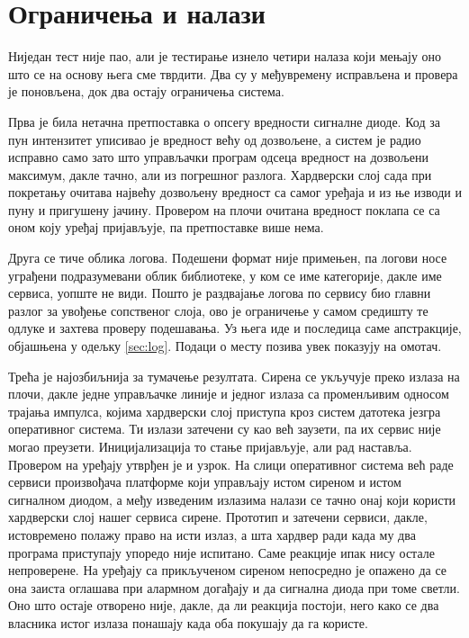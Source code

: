 \documentclass[12pt,oneside]{memoir}
\begin{document}
\section{Ограничења и налази}
\label{sec:ogranicenja}

Ниједан тест није пао, али је тестирање изнело четири налаза који мењају оно што се на
основу њега сме тврдити. Два су у међувремену исправљена и провера је поновљена, док два
остају ограничења система.

Прва је била нетачна претпоставка о опсегу вредности сигналне диоде. Код за пун интензитет
уписивао је вредност већу од дозвољене, а систем је радио исправно само зато што управљачки
програм одсеца вредност на дозвољени максимум, дакле тачно, али из погрешног разлога.
Хардверски слој сада при покретању очитава највећу дозвољену вредност са самог уређаја и из
ње изводи и пуну и пригушену јачину. Провером на плочи очитана вредност поклапа се са оном
коју уређај пријављује, па претпоставке више нема.

Друга се тиче облика логова. Подешени формат није примењен, па логови носе
уграђени подразумевани облик библиотеке, у ком се име категорије, дакле име сервиса, уопште
не види. Пошто је раздвајање логова по сервису био главни разлог за увођење сопственог слоја,
ово је ограничење у самом средишту те одлуке и захтева проверу подешавања. Уз њега иде и
последица саме апстракције, објашњена у одељку \ref{sec:log}. Подаци о месту позива увек
показују на омотач.

Трећа је најозбиљнија за тумачење резултата. Сирена се укључује преко излаза на плочи, дакле једне управљачке линије и једног излаза са 
променљивим односом трајања импулса, којима хардверски слој приступа кроз систем датотека језгра оперативног система. 
Ти излази затечени су као већ заузети, па их сервис није могао преузети. Иницијализација то стање пријављује, али рад
наставља. Провером на уређају утврђен је и узрок. На слици оперативног система већ раде
сервиси произвођача платформе који управљају истом сиреном и истом сигналном диодом, а међу
изведеним излазима налази се тачно онај који користи хардверски слој нашег сервиса сирене.
Прототип и затечени сервиси, дакле, истовремено полажу право на исти излаз, а шта хардвер ради 
када му два програма приступају упоредо није испитано. Саме реакције ипак нису остале непроверене. На уређају са
прикљученом сиреном непосредно је опажено да се она заиста оглашава при алармном догађају и
да сигнална диода при томе светли. Оно што остаје отворено није, дакле, да ли реакција
постоји, него како се два власника истог излаза понашају када оба покушају да га користе.
\end{document}
